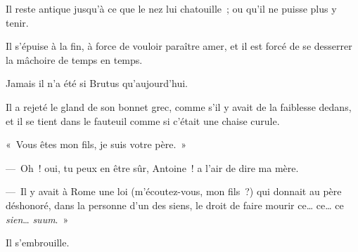 \documentclass[french,twoside]{book} %
\def\mednobreak{\ifdim\lastskip<\medskipamount
  \removelastskip\nopagebreak\medskip\fi}
\newcommand{\labelblock}[1]{\medbreak{\noindent\color{rubric}\bfseries #1}\par\mednobreak}
\begin{document}
Il reste antique jusqu’à ce que le nez lui chatouille ; ou qu’il ne puisse plus y tenir.\par
Il s’épuise à la fin, à force de vouloir paraître amer, et il est forcé de se desserrer la mâchoire de temps en temps.\par
\bigbreak
\noindent Jamais il n’a été si Brutus qu’aujourd’hui.\par
Il a rejeté le gland de son bonnet grec, comme s’il y avait de la faiblesse dedans, et il se tient dans le fauteuil comme si c’était une chaise curule.\par
« Vous êtes mon fils, je suis votre père. »\par
— Oh ! oui, tu peux en être sûr, Antoine ! a l’air de dire ma mère.\par
— Il y avait à Rome une loi (m’écoutez-vous, mon fils ?) qui donnait au père déshonoré, dans la personne d’un des siens, le droit de faire mourir ce… ce… ce \emph{sien}… \emph{suum}. »\par
Il s’embrouille.\par

\labelblock{PHILOSOPHIE}
\end{document}
